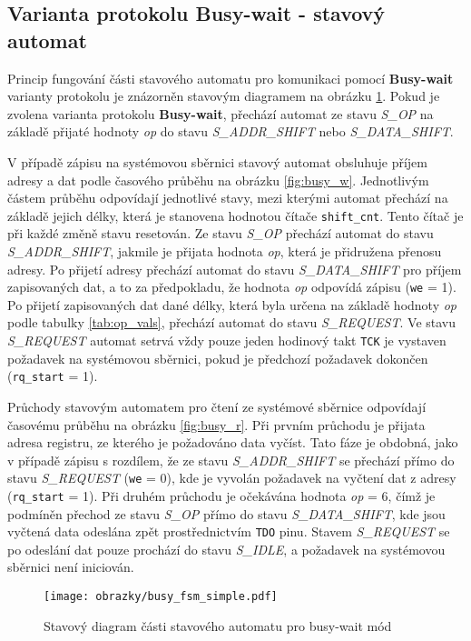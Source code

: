 \subsection{Varianta protokolu Busy-wait - stavový automat} \label{subsec:busy-wait-fsm}
Princip fungování části stavového automatu pro komunikaci pomocí \textbf{Busy-wait} varianty protokolu je znázorněn stavovým diagramem na obrázku \ref{fig:busy_wait_fsm}. Pokud je zvolena varianta protokolu \textbf{Busy-wait}, přechází automat ze stavu \textit{S\_OP} na základě přijaté hodnoty \textit{op} do stavu \textit{S\_ADDR\_SHIFT} nebo \textit{S\_DATA\_SHIFT}.

V případě zápisu na systémovou sběrnici stavový automat obsluhuje příjem adresy a dat podle časového průběhu na obrázku \ref{fig:busy_w}. Jednotlivým částem průběhu odpovídají jednotlivé stavy, mezi kterými automat přechází na základě jejich délky, která je stanovena hodnotou čítače \texttt{shift\_cnt}. Tento čítač je při každé změně stavu resetován. Ze stavu \textit{S\_OP} přechází automat do stavu \textit{S\_ADDR\_SHIFT}, jakmile je přijata hodnota \textit{op}, která je přidružena přenosu adresy. Po přijetí adresy přechází automat do stavu \textit{S\_DATA\_SHIFT} pro příjem zapisovaných dat, a to za předpokladu, že hodnota \textit{op} odpovídá zápisu (\texttt{we} = 1). Po přijetí zapisovaných dat dané délky, která byla určena na základě hodnoty \textit{op} podle tabulky \ref{tab:op_vals}, přechází automat do stavu \textit{S\_REQUEST}. Ve stavu \textit{S\_REQUEST} automat setrvá vždy pouze jeden hodinový takt \texttt{\acs{TCK}} je vystaven požadavek na systémovou sběrnici, pokud je předchozí požadavek dokončen (\texttt{rq\_start} = 1).

Průchody stavovým automatem pro čtení ze systémové sběrnice odpovídají časovému průběhu na obrázku \ref{fig:busy_r}. Při prvním průchodu je přijata adresa registru, ze kterého je požadováno data vyčíst. Tato fáze je obdobná, jako v případě zápisu s rozdílem, že ze stavu \textit{S\_ADDR\_SHIFT} se přechází přímo do stavu \textit{S\_REQUEST} (\texttt{we} = 0), kde je vyvolán požadavek na vyčtení dat z adresy (\texttt{rq\_start} = 1). Při druhém průchodu je očekávána hodnota \textit{op} = 6, čímž je podmíněn přechod ze stavu \textit{S\_OP} přímo do stavu \textit{S\_DATA\_SHIFT}, kde jsou vyčtená data odeslána zpět prostřednictvím \texttt{\acs{TDO}} pinu. Stavem \textit{S\_REQUEST} se po odeslání dat pouze prochází do stavu \textit{S\_IDLE}, a požadavek na systémovou sběrnici není iniciován.

\begin{figure}[H]
  \begin{center}
    \texttt{[image: obrazky/busy\_fsm\_simple.pdf]}
  \end{center}
  \caption{Stavový diagram části stavového automatu pro busy-wait mód}
	\label{fig:busy_wait_fsm}
\end{figure}
\pagebreak

